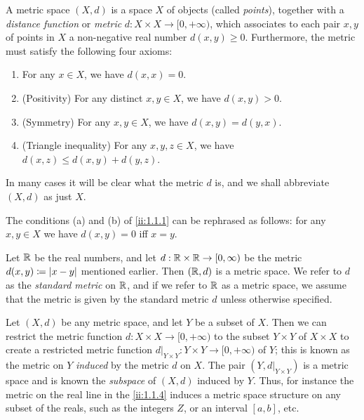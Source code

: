 \begin{defn}\label{ii:1.1.2}
  A metric space \((X, d)\) is a space \(X\) of objects (called \emph{points}), together with a \emph{distance function} or \emph{metric} \(d : X \times X \to [0, +\infty)\), which associates to each pair \(x, y\) of points in \(X\) a non-negative real number \(d(x, y) \geq 0\).
  Furthermore, the metric must satisfy the following four axioms:
  \begin{enumerate}
    \item For any \(x \in X\), we have \(d(x, x) = 0\).
    \item (Positivity) For any distinct \(x, y \in X\), we have \(d(x, y) > 0\).
    \item (Symmetry) For any \(x, y \in X\), we have \(d(x, y) = d(y, x)\).
    \item (Triangle inequality) For any \(x, y, z \in X\), we have \(d(x, z) \leq d(x, y) + d(y, z)\).
  \end{enumerate}
\end{defn}

\begin{note}
  In many cases it will be clear what the metric \(d\) is, and we shall abbreviate \((X, d)\) as just \(X\).
\end{note}

\begin{rmk}\label{ii:1.1.3}
  The conditions (a) and (b) of \cref{ii:1.1.1} can be rephrased as follows:
  for any \(x, y \in X\) we have \(d(x, y) = 0\) iff \(x = y\).
\end{rmk}

\begin{eg}\label{ii:1.1.4}
  Let \(\mathbb{R}\) be the real numbers, and let \(d : \mathbb{R} \times \mathbb{R} \to [0, \infty)\) be the metric \(d(x, y) \coloneqq \left\lvert x - y\right\rvert\) mentioned earlier.
  Then \((\mathbb{R}, d)\) is a metric space.
  We refer to \(d\) as the \emph{standard metric} on \(\mathbb{R}\), and if we refer to \(\mathbb{R}\) as a metric space, we assume that the metric is given by the standard metric \(d\) unless otherwise specified.
\end{eg}

\begin{eg}\label{ii:1.1.5}
  Let \((X, d)\) be any metric space, and let \(Y\) be a subset of \(X\).
  Then we can restrict the metric function \(d : X \times X \to [0, +\infty)\) to the subset \(Y \times Y\) of \(X \times X\) to create a restricted metric function \(d|_{Y \times Y} : Y \times Y \to [0, +\infty)\) of \(Y\);
  this is known as the metric on \(Y\) \emph{induced} by the metric \(d\) on \(X\).
  The pair \((Y, d|_{Y \times Y})\) is a metric space and is known the \emph{subspace} of \((X, d)\) induced by \(Y\).
  Thus, for instance the metric on the real line in the \cref{ii:1.1.4} induces a metric space structure on any subset of the reals, such as the integers \(Z\), or an interval \([a, b]\), etc.
\end{eg}


